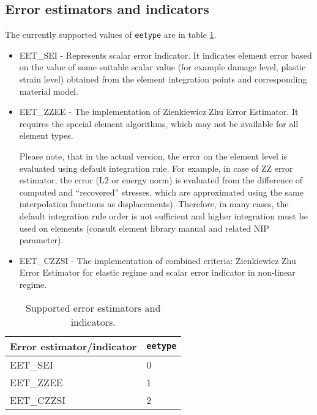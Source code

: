 \documentclass[a4paper]{article}
\newcommand{\param}[1]{\texttt{#1}} %
\begin{document}
\subsection{Error estimators and indicators}
\label{errorestimators}
The currently supported values of \param{eetype} are in table
\ref{eetypestable}.
\begin{itemize}
\item
EET\_SEI - Represents scalar error indicator.
It indicates element error based on the value of some suitable scalar
value (for example damage level, plastic strain level) obtained from the
element integration points and corresponding material model.
\item
EET\_ZZEE - The implementation of Zienkiewicz Zhu Error
Estimator. It requires the special element algorithms, which may not
be available for all element types.

Please note, that in the actual version, the error on the element level is evaluated using default integration rule. For example, in case of ZZ error estimator, the error (L2 or energy norm) is evaluated from the difference of computed and ``recovered'' stresses, which are approximated using the same interpolation functions as displacements). Therefore, in many cases, the default integration rule order is not sufficient and higher integration must be used on elements (consult element library manual and related NIP parameter).

\item
EET\_CZZSI - The implementation of combined criteria: Zienkiewicz Zhu Error Estimator for elastic regime and
scalar error indicator in non-linear regime.
\end{itemize}

\begin{table}[ht]
\begin{center}
\begin{tabular}{|l|l|}
\hline
Error estimator/indicator & \param{eetype}\\
\hline
EET\_SEI & 0 \\
EET\_ZZEE& 1 \\
EET\_CZZSI& 2\\
\hline
\end{tabular}
\caption{Supported error estimators and indicators.}
\label{eetypestable}
\end{center}
\end{table}
\end{document}
